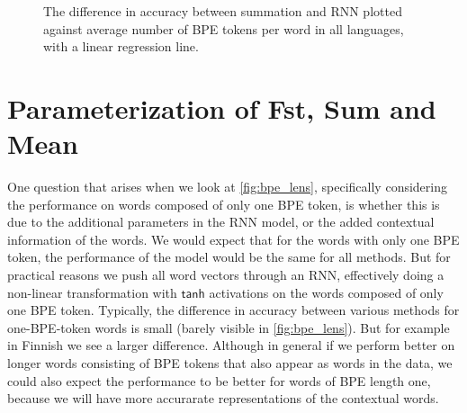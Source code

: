 \documentclass[11pt]{article}
\begin{document}
\begin{figure}
        \caption{The difference in accuracy between summation and RNN plotted against average number of BPE
     tokens per word in all languages, with a linear regression line.}
    \label{fig:scatter_len}
    \end{figure}

    \section{Parameterization of Fst, Sum and Mean}

        One question that arises when we look at
     \cref{fig:bpe_lens}, specifically considering the performance on
     words composed of only one BPE token, is whether this is due to
     the additional parameters in the RNN model, or the added
     contextual information of the words. We would expect that for the
     words with only one BPE token, the performance of the model would
     be the same for all methods. But for practical reasons we push
     all word vectors through an RNN, effectively doing a non-linear
     transformation with $\mathsf{tanh}$ activations on the words
     composed of only one BPE token.
                Typically, the difference in accuracy between various
     methods for one-BPE-token words is small (barely visible in
     \cref{fig:bpe_lens}). But for example in Finnish we see a larger
     difference. Although in general if we perform better on longer
     words consisting of BPE tokens that also appear as words in the
     data, we could also expect the performance to be better for
     words of BPE length one, because we will have more accurarate
     representations of the contextual words.
\end{document}
